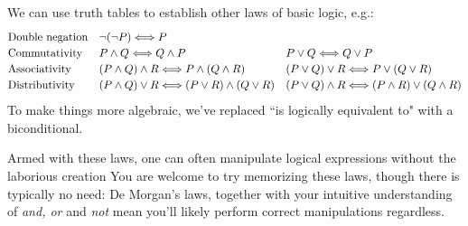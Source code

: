 \goodbreak


\begin{aside}{}{}
	\label{pg:asidelogicalgebra}
	
	We can use truth tables to establish other laws of basic logic, e.g.:
	\[
		\def\arraystretch{1.2}
		\begin{array}{@{}lll@{}}
			\text{Double negation} & \neg(\neg P)\Longleftrightarrow P &\\
			\text{Commutativity} & P\wedge Q\Longleftrightarrow Q\wedge P & P\vee Q\Longleftrightarrow Q\vee P\\
			\text{Associativity} & (P\wedge Q)\wedge R\Longleftrightarrow P\wedge(Q\wedge R) & (P\vee Q)\vee R\Longleftrightarrow P\vee(Q\vee R)\\
			\text{Distributivity}&(P\wedge Q)\vee R\Longleftrightarrow (P\vee R)\wedge (Q\vee R) & (P\vee Q)\wedge R\Longleftrightarrow (P\wedge R)\vee (Q\wedge R)
		\end{array}
	\]
	To make things more algebraic, we've replaced ``is logically equivalent to" with a biconditional.\footnotemark{}\smallbreak
	
	Armed with these laws, one can often manipulate logical expressions without the laborious creation You are welcome to try memorizing these laws, though there is typically no need: De Morgan's laws, together with your intuitive understanding of \emph{and, or} and \emph{not} mean you'll likely perform correct manipulations regardless.
\end{aside}





